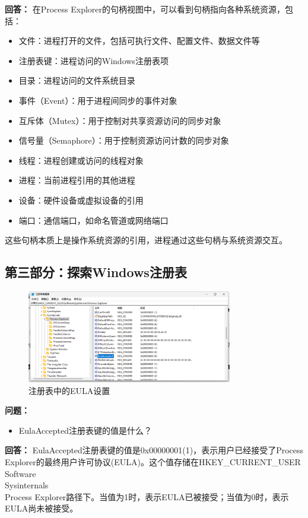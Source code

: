 \documentclass[12pt,a4paper]{article}
\begin{document}
\textbf{回答：}
在Process Explorer的句柄视图中，可以看到句柄指向各种系统资源，包括：
\begin{itemize}
    \item 文件：进程打开的文件，包括可执行文件、配置文件、数据文件等
    \item 注册表键：进程访问的Windows注册表项
    \item 目录：进程访问的文件系统目录
    \item 事件（Event）：用于进程间同步的事件对象
    \item 互斥体（Mutex）：用于控制对共享资源访问的同步对象
    \item 信号量（Semaphore）：用于控制资源访问计数的同步对象
    \item 线程：进程创建或访问的线程对象
    \item 进程：当前进程引用的其他进程
    \item 设备：硬件设备或虚拟设备的引用
    \item 端口：通信端口，如命名管道或网络端口
\end{itemize}
这些句柄本质上是操作系统资源的引用，进程通过这些句柄与系统资源交互。

\subsection{第三部分：探索Windows注册表}

\begin{figure}[H]
    \centering
    \includegraphics[width=0.8\textwidth]{Eula.png}
    \caption{注册表中的EULA设置}
    \label{fig:eula}
\end{figure}

\textbf{问题：}
\begin{itemize}
    \item EulaAccepted注册表键的值是什么？
\end{itemize}

\textbf{回答：}
EulaAccepted注册表键的值是0x00000001(1)，表示用户已经接受了Process Explorer的最终用户许可协议(EULA)。这个值存储在HKEY\_CURRENT\_USER\\Software\\Sysinternals\\Process Explorer路径下。当值为1时，表示EULA已被接受；当值为0时，表示EULA尚未被接受。
\end{document}
